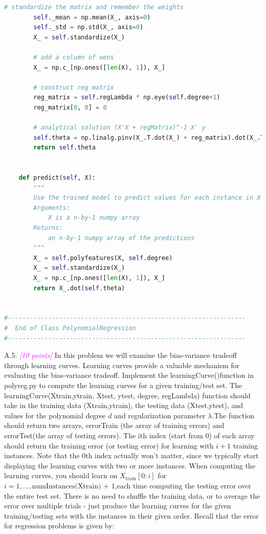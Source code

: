 \documentclass{article}
\newcommand{\1}{\mathbf{1}}
\newcommand{\points}[1]{\small\textcolor{magenta}{\emph{[#1 points]}} \normalsize}
\begin{document}
\begin{lstlisting}[language=Python]
        # standardize the matrix and remember the weights
        self._mean = np.mean(X_, axis=0)
        self._std = np.std(X_, axis=0)
        X_ = self.standardize(X_)

        # add a column of oens
        X_ = np.c_[np.ones([len(X), 1]), X_]

        # construct reg matrix
        reg_matrix = self.regLambda * np.eye(self.degree+1)
        reg_matrix[0, 0] = 0

        # analytical solution (X'X + regMatrix)^-1 X' y
        self.theta = np.linalg.pinv(X_.T.dot(X_) + reg_matrix).dot(X_.T).dot(y)
        return self.theta


    def predict(self, X):
        """
        Use the trained model to predict values for each instance in X
        Arguments:
            X is a n-by-1 numpy array
        Returns:
            an n-by-1 numpy array of the predictions
        """
        X_ = self.polyfeatures(X, self.degree)
        X_ = self.standardize(X_)
        X_ = np.c_[np.ones([len(X), 1]), X_]        
        return X_.dot(self.theta)


#-----------------------------------------------------------------
#  End of Class PolynomialRegression
#-----------------------------------------------------------------
\end{lstlisting}




\newpage
A.5. \points{10} In this problem we will examine the bias-variance tradeoff through learning curves. Learning curves provide a valuable mechanism for evaluating the bias-variance tradeoff. Implement the learningCurve()function in polyreg.py to compute the learning curves for a given training/test set. The learningCurve(Xtrain,ytrain, Xtest, ytest, degree, regLambda) function should take in the training data (Xtrain,ytrain), the testing data (Xtest,ytest), and values for the polynomial degree $d$ and regularization parameter $\lambda$.The function should return two arrays, errorTrain (the array of training errors) and errorTest(the array of testing errors). The ith index (start from 0) of each array should return the training error (or testing error) for learning with $i+1$ training instances. Note that the 0th index actually won’t matter, since we typically start displaying the learning curves with two or more instances. When computing the learning curves, you should learn on $X_\text{train}[0:i]$ for $i= 1,...,\text{numInstances(Xtrain) + 1}$,each time computing the testing error over the entire test set. There is no need to shuffle the training data, or to average the error over multiple trials - just produce the learning curves for the given training/testing sets with the instances in their given order. Recall that the error for regression problems is given by:
\end{document}
